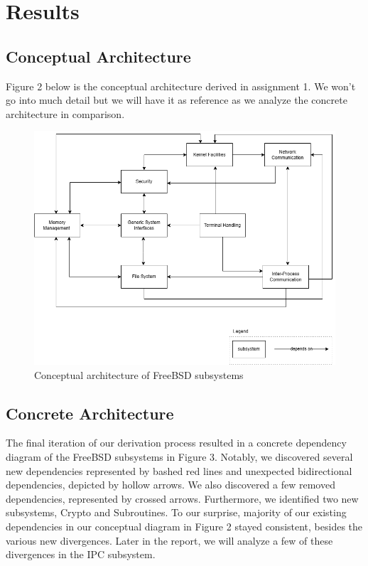 \documentclass[12pt, dvipsnames, a4paper]{article}
\begin{document}
\section{Results}
\subsection{Conceptual Architecture}
Figure 2 below is the conceptual architecture derived in assignment 1. We won't go into much detail but we will have it as reference as we analyze the concrete architecture in comparison.

\begin{figure}[!htb]
	\center
	\includegraphics[width = 390pt]{assets/conceptual-architecture.png}
	\caption{Conceptual architecture of FreeBSD subsystems}
\end{figure}
\subsection{Concrete Architecture}

The final iteration of our derivation process resulted in a concrete dependency diagram of the FreeBSD subsystems in Figure 3. Notably, we discovered several new dependencies represented by bashed red lines and unexpected bidirectional dependencies, depicted by hollow arrows. We also discovered a few removed dependencies, represented by crossed arrows. Furthermore, we identified two new subsystems, Crypto and Subroutines. To our surprise, majority of our existing dependencies in our conceptual diagram in Figure 2 stayed consistent, besides the various new divergences. Later in the report, we will analyze a few of these divergences in the IPC subsystem.
\end{document}
